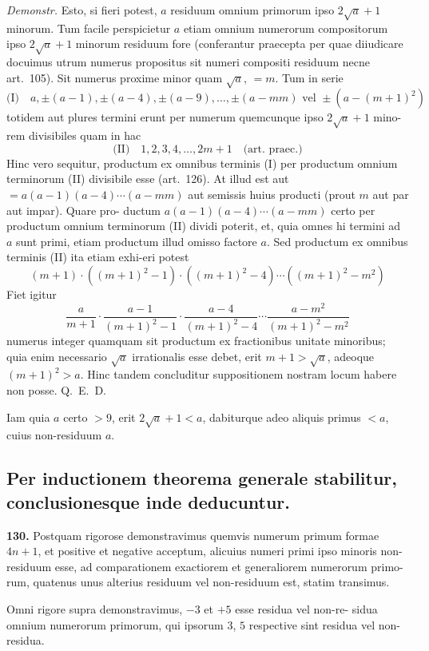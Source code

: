\documentclass[12pt,a4paper]{article}
\begin{document}
\textit{Demonstr.} Esto, si fieri potest, $a$ residuum omnium primorum ipso $2\sqrt{a}+1$
minorum. Tum facile perspicietur $a$ etiam omnium numerorum compositorum
ipso $2\sqrt{a}+1$ minorum residuum fore (conferantur praecepta per quae diiudicare
docuimus utrum numerus propositus sit numeri compositi residuum necne art.~105). Sit numerus proxime minor quam $\sqrt{a}$, $= m$. Tum in serie
\[
\text{(I)} \quad a, \pm(a-1), \pm(a-4), \pm(a-9), \ldots, \pm(a-mm) \text{ vel } \pm(a-(m+1)^2)
\]
totidem aut plures termini erunt per numerum quemcunque ipso $2\sqrt{a}+1$ mino-
rem divisibiles quam in hac
\[
\text{(II)} \quad 1, 2, 3, 4, \ldots, 2m+1 \quad \text{(art.~praec.)}
\]
Hinc vero sequitur, productum ex omnibus terminis (I) per productum omnium
terminorum (II) divisibile esse (art.~126). At illud est aut $= a(a-1)(a-4)\cdots
(a-mm)$ aut semissis huius producti (prout $m$ aut par aut impar). Quare pro-
ductum $a(a-1)(a-4)\cdots(a-mm)$ certo per productum omnium terminorum
(II) dividi poterit, et, quia omnes hi termini ad $a$ sunt primi, etiam productum
illud omisso factore $a$. Sed productum ex omnibus terminis (II) ita etiam exhi-eri potest
\[
(m+1) \cdot ((m+1)^2-1) \cdot ((m+1)^2-4) \cdots ((m+1)^2-m^2)
\]
Fiet igitur
\[
\frac{a}{m+1} \cdot \frac{a-1}{(m+1)^2-1} \cdot \frac{a-4}{(m+1)^2-4} \cdots \frac{a-m^2}{(m+1)^2-m^2}
\]
numerus integer quamquam sit productum ex fractionibus unitate minoribus;
quia enim necessario $\sqrt{a}$ irrationalis esse debet, erit $m+1 > \sqrt{a}$, adeoque
$(m+1)^2 > a$. Hinc tandem concluditur suppositionem nostram locum habere non
posse. Q.~E.~D.

Iam quia $a$ certo $> 9$, erit $2\sqrt{a}+1 < a$, dabiturque adeo aliquis primus
$< a$, cuius non-residuum $a$.

\subsection*{Per inductionem theorema generale stabilitur, conclusionesque inde deducuntur.}

\textbf{130.}
Postquam rigorose demonstravimus quemvis numerum primum formae
$4n+1$, et positive et negative acceptum, alicuius numeri primi ipso minoris non-
residuum esse, ad comparationem exactiorem et generaliorem numerorum primo-
rum, quatenus unus alterius residuum vel non-residuum est, statim transimus.

Omni rigore supra demonstravimus, $-3$ et $+5$ esse residua vel non-re-
sidua omnium numerorum primorum, qui ipsorum $3$, $5$ respective sint residua vel
non-residua.
\end{document}
